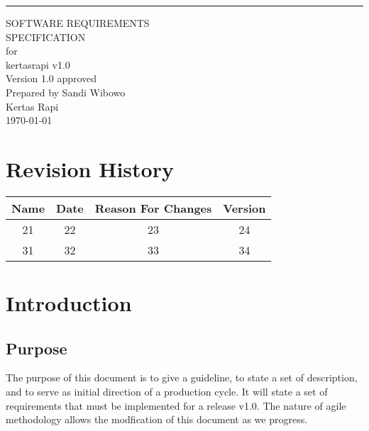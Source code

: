 \documentclass{scrreprt}
\date{}
\def\myversion{1.0 }
\begin{document}
\begin{flushright}
    \rule{16cm}{5pt}\vskip1cm
    \begin{bfseries}
        \Huge{SOFTWARE REQUIREMENTS\\ SPECIFICATION}\\
        \vspace{1.9cm}
        for\\
        \vspace{1.9cm}
        kertasrapi v1.0\\
        \vspace{1.9cm}
        \LARGE{Version \myversion approved}\\
        \vspace{1.9cm}
        Prepared by Sandi Wibowo\\
        \vspace{1.9cm}
        Kertas Rapi\\
        \vspace{1.9cm}
        \today\\
    \end{bfseries}
\end{flushright}

\tableofcontents


\chapter*{Revision History}

\begin{center}
    \begin{tabular}{|c|c|c|c|}
        \hline
	    Name & Date & Reason For Changes & Version\\
        \hline
	    21 & 22 & 23 & 24\\
        \hline
	    31 & 32 & 33 & 34\\
        \hline
    \end{tabular}
\end{center}

\chapter{Introduction}

\section{Purpose}
The purpose of this document is to give a guideline, to state a set of description, and to serve as initial direction of a production cycle. It will state a set of requirements that must be implemented for a release v1.0. The nature of agile methodology allows the modfication of this document as we progress. 
\end{document}
